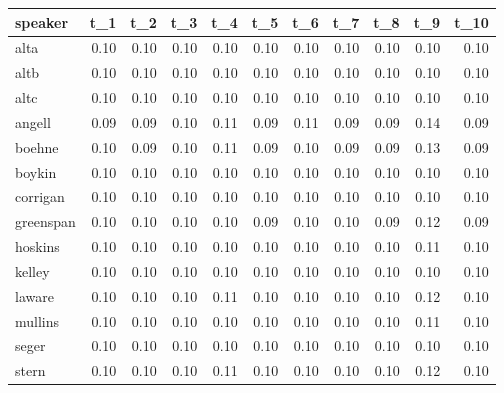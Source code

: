 \begin{tabular}{lrrrrrrrrrr}
\toprule
   speaker &  t\_1 &  t\_2 &  t\_3 &  t\_4 &  t\_5 &  t\_6 &  t\_7 &  t\_8 &  t\_9 &  t\_10 \\
\midrule
      alta & 0.10 & 0.10 & 0.10 & 0.10 & 0.10 & 0.10 & 0.10 & 0.10 & 0.10 &  0.10 \\
      altb & 0.10 & 0.10 & 0.10 & 0.10 & 0.10 & 0.10 & 0.10 & 0.10 & 0.10 &  0.10 \\
      altc & 0.10 & 0.10 & 0.10 & 0.10 & 0.10 & 0.10 & 0.10 & 0.10 & 0.10 &  0.10 \\
    angell & 0.09 & 0.09 & 0.10 & 0.11 & 0.09 & 0.11 & 0.09 & 0.09 & 0.14 &  0.09 \\
    boehne & 0.10 & 0.09 & 0.10 & 0.11 & 0.09 & 0.10 & 0.09 & 0.09 & 0.13 &  0.09 \\
    boykin & 0.10 & 0.10 & 0.10 & 0.10 & 0.10 & 0.10 & 0.10 & 0.10 & 0.10 &  0.10 \\
  corrigan & 0.10 & 0.10 & 0.10 & 0.10 & 0.10 & 0.10 & 0.10 & 0.10 & 0.10 &  0.10 \\
 greenspan & 0.10 & 0.10 & 0.10 & 0.10 & 0.09 & 0.10 & 0.10 & 0.09 & 0.12 &  0.09 \\
   hoskins & 0.10 & 0.10 & 0.10 & 0.10 & 0.10 & 0.10 & 0.10 & 0.10 & 0.11 &  0.10 \\
    kelley & 0.10 & 0.10 & 0.10 & 0.10 & 0.10 & 0.10 & 0.10 & 0.10 & 0.10 &  0.10 \\
    laware & 0.10 & 0.10 & 0.10 & 0.11 & 0.10 & 0.10 & 0.10 & 0.10 & 0.12 &  0.10 \\
   mullins & 0.10 & 0.10 & 0.10 & 0.10 & 0.10 & 0.10 & 0.10 & 0.10 & 0.11 &  0.10 \\
     seger & 0.10 & 0.10 & 0.10 & 0.10 & 0.10 & 0.10 & 0.10 & 0.10 & 0.10 &  0.10 \\
     stern & 0.10 & 0.10 & 0.10 & 0.11 & 0.10 & 0.10 & 0.10 & 0.10 & 0.12 &  0.10 \\
\bottomrule
\end{tabular}
